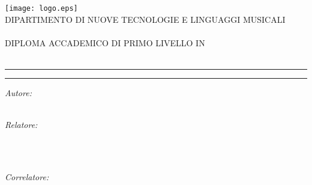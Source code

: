 
\begin{titlepage}
  \begin{center}
    {\LARGE
      \texttt{[image: logo.eps]} \\[0.5cm]

      {\normalsize{DIPARTIMENTO DI NUOVE TECNOLOGIE E LINGUAGGI MUSICALI}} \\[-0.2cm]
      {} \\[0.5cm]

      {\normalsize{DIPLOMA ACCADEMICO DI PRIMO LIVELLO IN}} \\[-0.2cm]
      {} \\[1.414cm]

      {\huge{\spacedlowsmallcaps{\myName}}}\vspace{-0.3cm}
      \par\noindent\rule{\textwidth}{0.4pt}\vspace{0.3cm}
      {\Huge{\color{bbari}\spacedallcaps{\myTitle}}}
      \par\noindent\rule{\textwidth}{0.4pt}\vspace{0.3cm}
      {\spacedlowsmallcaps{\mySubTitle}}
    }

    \vspace{2.718cm}

    \begin{minipage}[t]{0.49\textwidth}
    \begin{flushleft} \large
    \emph{Autore:}\\
    \spacedlowsmallcaps{\myName}\\
    \end{flushleft}
    \end{minipage}
    \begin{minipage}[t]{0.49\textwidth}
    \begin{flushright} \large
    \emph{Relatore:} \\
    \\
    \end{flushright}
    \end{minipage}\\[0.5cm]
    \begin{minipage}[t]{0.99\textwidth}
    \begin{flushright} \large
    \emph{Correlatore:} \\
    \\
    \end{flushright}
    \end{minipage}\\[3cm]


\end{center}
\end{titlepage}
